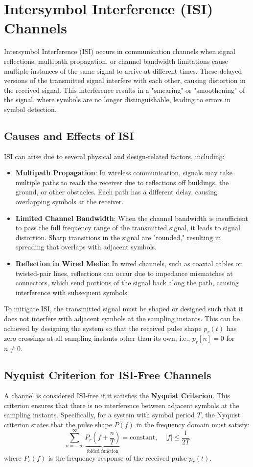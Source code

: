 \documentclass[10pt]{article}
\begin{document}
\section{Intersymbol Interference (ISI) Channels}
Intersymbol Interference (ISI) occurs in communication channels when signal reflections, multipath propagation, or channel bandwidth limitations cause multiple instances of the same signal to arrive at different times. These delayed versions of the transmitted signal interfere with each other, causing distortion in the received signal. This interference results in a "smearing" or "smoothening" of the signal, where symbols are no longer distinguishable, leading to errors in symbol detection.

\subsection{Causes and Effects of ISI}
ISI can arise due to several physical and design-related factors, including:
\begin{itemize}
    \item \textbf{Multipath Propagation}: In wireless communication, signals may take multiple paths to reach the receiver due to reflections off buildings, the ground, or other obstacles. Each path has a different delay, causing overlapping symbols at the receiver.
    \item \textbf{Limited Channel Bandwidth}: When the channel bandwidth is insufficient to pass the full frequency range of the transmitted signal, it leads to signal distortion. Sharp transitions in the signal are "rounded," resulting in spreading that overlaps with adjacent symbols.
    \item \textbf{Reflection in Wired Media}: In wired channels, such as coaxial cables or twisted-pair lines, reflections can occur due to impedance mismatches at connectors, which send portions of the signal back along the path, causing interference with subsequent symbols.
\end{itemize}

To mitigate ISI, the transmitted signal must be shaped or designed such that it does not interfere with adjacent symbols at the sampling instants. This can be achieved by designing the system so that the received pulse shape \( p_r(t) \) has zero crossings at all sampling instants other than its own, i.e., \( p_r[n] = 0 \) for \( n \neq 0 \).

\subsection{Nyquist Criterion for ISI-Free Channels}
A channel is considered ISI-free if it satisfies the \textbf{Nyquist Criterion}. This criterion ensures that there is no interference between adjacent symbols at the sampling instants. Specifically, for a system with symbol period \( T \), the Nyquist criterion states that the pulse shape \( P(f) \) in the frequency domain must satisfy:
\[
    \sum_{n=-\infty}^{\infty} \underbrace{P_r\left(f + \frac{n}{T}\right)}_{\text{folded function}} = \text{constant}, \quad |f| \le \frac{1}{2T}
\]
where \( P_r(f) \) is the frequency response of the received pulse \( p_r(t) \).
\end{document}
